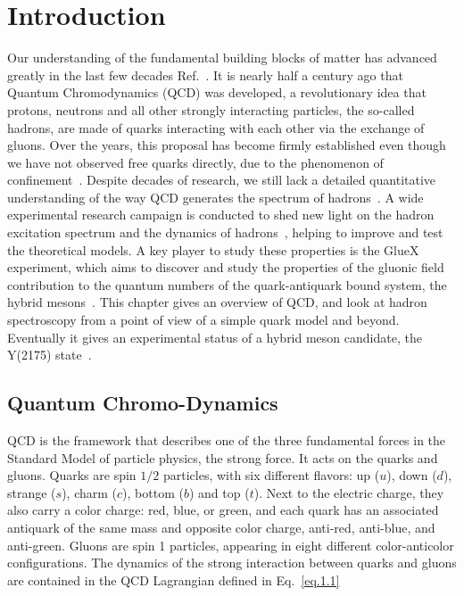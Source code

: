 \chapter{Introduction}
\label{chap.intro}

Our understanding of the fundamental building blocks of matter has advanced greatly in the last few decades Ref.~\cite{Fritzsch94,Gell64,Gell62,Neeman61,Zweig64}. It is nearly half a century ago that Quantum Chromodynamics (QCD) was developed, a revolutionary idea that protons, neutrons and all other strongly interacting particles, the so-called hadrons, are made of quarks interacting with each other via the exchange of gluons. Over the years, this proposal has become firmly established even though we have not observed free quarks directly, due to the phenomenon of confinement~\cite{Gross05}. Despite decades of research, we still lack a detailed quantitative understanding of the way QCD generates the spectrum of hadrons~\cite{Wilczek05}. A wide experimental research campaign is conducted to shed new light on the hadron excitation spectrum and the dynamics of hadrons~\cite{Tanabashi18}, helping to improve and test the theoretical models. A key player to study these properties is the GlueX experiment, which aims to discover and study the properties of the gluonic field contribution to the quantum numbers of the quark-antiquark bound system, the hybrid mesons~\cite{Meyer18}. This chapter gives an overview of QCD, and look at hadron spectroscopy from a point of view of a simple quark model and beyond. Eventually it gives an experimental status of a hybrid meson candidate, the Y(2175) state~\cite{Gui07}.

\section{Quantum Chromo-Dynamics}
\label{p.1.1}

QCD is the framework that describes one of the three fundamental forces in the Standard Model of particle physics, the strong force. It acts on the quarks and gluons. Quarks are spin $1/2$ particles, with six different flavors: up ($u$), down ($d$), strange ($s$), charm ($c$), bottom ($b$) and top ($t$). Next to the electric charge, they also carry a color charge: red, blue, or green, and each quark has an associated antiquark of the same mass and opposite color charge, anti-red, anti-blue, and anti-green. Gluons are spin 1 particles, appearing in eight different color-anticolor configurations. The dynamics of the strong interaction between quarks and gluons are contained in the QCD Lagrangian defined in Eq.~\ref{eq.1.1}

